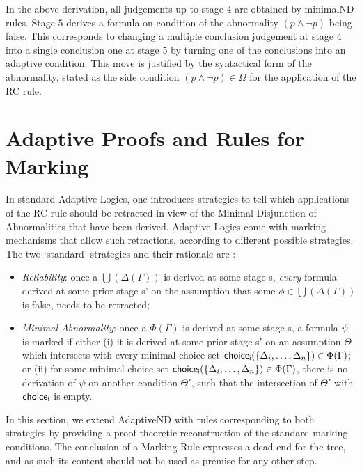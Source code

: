 \documentclass[]{article}
\begin{document}
In the above derivation, all judgements up to stage $4$ are obtained by {\sf minimalND} rules. Stage $5$ derives a formula on condition of the abnormality $(p\wedge \neg p)$ being false.  This corresponds to changing a multiple conclusion judgement at stage $4$ into a single conclusion one at stage $5$ by turning one of the conclusions into an adaptive condition. This move is justified by the syntactical form of the abnormality, stated as the side condition $(p \wedge \neg p)\in \Omega$ for the application of the {\sf RC} rule.



\section{Adaptive Proofs and Rules for Marking}\label{sec:marking}

In standard Adaptive Logics, one introduces strategies to tell which applications of the {\sf RC} rule should be retracted in view of the Minimal Disjunction of Abnormalities that have been derived. Adaptive Logics come with marking mechanisms that allow such retractions, according to different possible strategies. The two `standard' strategies and their rationale are \cite{batens01}:

\begin{itemize}
    \item \textit{Reliability}: once a $\bigcup(\Delta(\Gamma))$ is derived at some stage {\sf s}, \textit{every} formula derived at some prior stage {\sf s'} on the assumption that some $\phi\in \bigcup(\Delta(\Gamma))$ is false, needs to be retracted;

\item \textit{Minimal Abnormality}: once a $\Phi(\Gamma)$ is derived at some stage {\sf s}, a formula $\psi$ is marked if either (i) it is derived at some prior stage {\sf s'} on an assumption $\Theta$ which intersects with every minimal choice-set ${\sf choice_{i}}(\{\Delta_{i}, \ldots, \Delta_{n}\})\in \Phi(\Gamma)$; or (ii) for some minimal choice-set ${\sf choice_{i}}(\{\Delta_{i}, \ldots, \Delta_{n}\})\in \Phi(\Gamma)$, there is no derivation of $\psi$ on another condition $\Theta'$, such that the intersection of $\Theta'$ with ${\sf choice_{i}}$ is empty.
\end{itemize}
%
In this section, we extend {\sf AdaptiveND} with rules corresponding to both strategies by providing a proof-theoretic reconstruction of the standard marking conditions. The conclusion of a Marking Rule expresses a dead-end for the tree, and as such its content should not be used as premise for any other step. 
\end{document}
